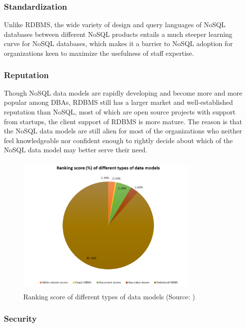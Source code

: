 \subsubsection{Standardization}\mbox{}

Unlike RDBMS, the wide variety of design and query languages of NoSQL databases between different NoSQL products entails a much steeper learning curve for NoSQL databases, which makes it a barrier to NoSQL adoption for organizations keen to maximize the usefulness of staff expertise\cite{limit}.


\subsubsection{Reputation}\mbox{}

Though NoSQL data
models are rapidly developing and become more and more popular among DBAs, RDBMS still has a larger market and well-established reputation than NoSQL, most of which are open source projects with support from startups, the client support of RDBMS is more mature. 
The reason
is that the NoSQL data models are still alien for most of the organizations who
neither feel knowledgeable nor confident enough to rightly decide about which of the NoSQL data model
may better serve their need\cite{DBLP:journals/corr/Sharma15b}.

\begin{figure}[H]
	\includegraphics[height=7cm, width=9cm]{../../../images/rank.png}
	\caption{Ranking score of different types of data models (Source: \cite{DBLP:journals/corr/Sharma15b})}
\end{figure}


\subsubsection{Security}\mbox{}

